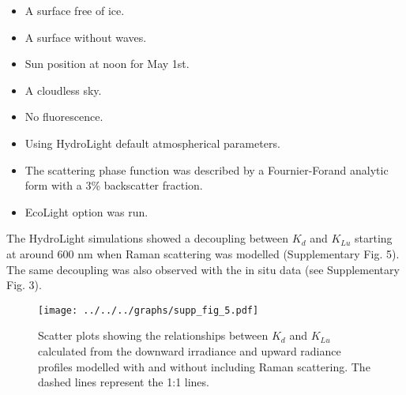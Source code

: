 \documentclass[12pt,a4paper]{scrartcl}
\newcommand{\ked}{\ensuremath{K_{d}}}
\newcommand{\klu}{\ensuremath{K_{Lu}}}
\newcommand{\edz}{\ensuremath{{E_d(z)}}}
\newcommand{\edzero}{\ensuremath{{E_d(0^-)}}}
\newcommand{\edzkd}{\ensuremath{{E_d^{K_d}(z)}}}
\newcommand{\luzkd}{\ensuremath{{E_d^{K_{Lu}}(z)}}}
\begin{document}
\begin{itemize}
	\item A surface free of ice.
	\item A surface without waves.
	\item Sun position at noon for May 1st.
	\item A cloudless sky.
	\item No fluorescence.
	\item Using HydroLight default atmospherical parameters.
	\item The scattering phase function was described by a Fournier-Forand analytic form with a 3\% backscatter fraction.
	\item EcoLight option was run.
\end{itemize}

The HydroLight simulations showed a decoupling between \ked{} and \klu{} starting at around 600 nm when Raman scattering was modelled (Supplementary Fig. 5). The same decoupling was also observed with the in situ data (see Supplementary Fig. 3).

\begin{figure}[H]
	\centering
	\texttt{[image: ../../../graphs/supp\_fig\_5.pdf]}
	\caption{Scatter plots showing the relationships between \ked{} and \klu{} calculated from the downward irradiance and upward radiance profiles modelled with and without including Raman scattering. The dashed lines represent the 1:1 lines.}
\end{figure}




\end{document}
